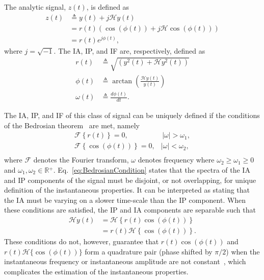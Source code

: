 \documentclass[11pt,draftcls,onecolumn]{IEEEtran}
\begin{document}
The analytic signal, $z(t)$, is defined as
\begin{align}\label{eq:AnalyticSignal}
	z\left( t \right) &\triangleq y\left( t \right) + j\mathcal{H}y\left( t \right) \\
    &= r\left( t \right)\left(\cos\left(\phi\left(t\right)\right) + j \mathcal{H}\cos\left(\phi\left(t\right)\right)\right) \\
&= r\left( t \right){e^{j\phi \left( t \right)}},
\end{align}
where $j=\sqrt{-1}$. The IA, IP, and IF are, respectively, defined as
\begin{align}
	r(t) &\triangleq \sqrt{\left(y^2(t) + \mathcal{H}y^2(t)\right)}\label{eq:IAdef}\\
	\phi(t) &\triangleq \arctan\left(\frac{\mathcal{H}y\left( t \right)}{y\left(t\right)}\right) \label{eq:IPdef}\\
\omega \left( t \right) &\triangleq \frac{d\phi \left( t \right)}{dt}. \label{eq:IFdef}
\end{align}

The IA, IP, and IF of this class of signal can be uniquely defined if the conditions of the Bedrosian theorem~\cite{Bedrosian1963} are met, namely
\begin{equation}\label{eq:BedrosianCondition}
\begin{array}{*{20}{c}}
   {\mathcal{F}\left\{ {r\left( t \right)} \right\} = 0,} & {\,\left| \omega \right| > \omega_1,}  \\
   {\mathcal{F}\left\{ {\cos\left(\phi \left( t \right)\right)} \right\} = 0,} & {\left| \omega \right| < \omega_2,}  \\
\end{array}
\end{equation}
where $\mathcal{F}$ denotes the Fourier transform, $\omega$ denotes frequency where $\omega_2 \ge \omega_1 \ge 0$ and $\omega_1,\omega_2 \in \mathbb{R}{^ + }$. Eq.~\ref{eq:BedrosianCondition} states that the spectra of the IA and IP components of the signal must be disjoint, or not overlapping, for unique definition of the instantaneous properties. It can be interpreted as stating that the IA must be varying on a slower time-scale than the IP component. When these conditions are satisfied, the IP and IA components are separable such that
\begin{align}\label{eq:SepAmpandPhase}
   \mathcal{H}y\left( t \right) &= \mathcal{H}\left\{ {r\left( t \right)\cos \left( {\phi \left( t \right)} \right)} \right\} \nonumber \\
   &= r\left( t \right)\mathcal{H}\left\{ {\cos \left( {\phi \left( t \right)} \right)} \right\}.
\end{align}
These conditions do not, however, guarantee that $r\left(t\right)\cos(\phi(t))$ and $r\left(t\right)\mathcal{H}\{\cos(\phi(t))\}$ form a quadrature pair (phase shifted by $\pi/2$) when the instantaneous frequency or instantaneous amplitude are not constant~\cite{Nuttall1966}, which complicates the estimation of the instantaneous properties. 
\end{document}
